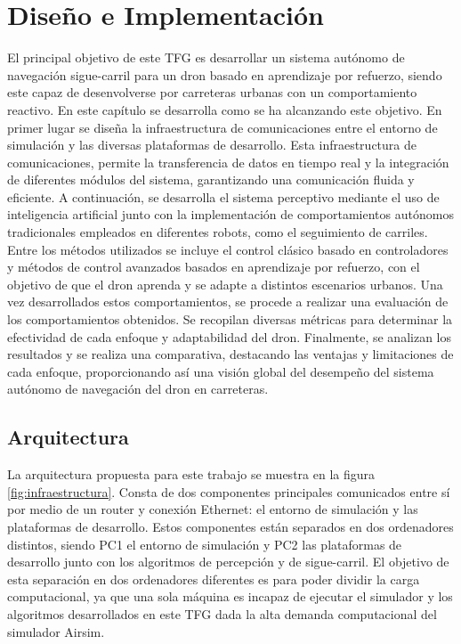 \chapter{Diseño e Implementación}
\label{cap:capitulo4}


\vspace{1cm}
El principal objetivo de este TFG es desarrollar un sistema autónomo de navegación sigue-carril para un dron basado en aprendizaje por refuerzo, siendo este capaz de desenvolverse
por carreteras urbanas con un comportamiento reactivo.
En este capítulo se desarrolla como se ha alcanzando este objetivo. En primer lugar se diseña la infraestructura de comunicaciones entre el entorno de simulación y las diversas 
plataformas de desarrollo. Esta 
infraestructura de comunicaciones, permite la transferencia de datos en tiempo real y la integración de diferentes módulos del sistema, garantizando 
una comunicación fluida y eficiente.
A continuación, se desarrolla el sistema perceptivo mediante el uso de inteligencia artificial junto con la implementación de comportamientos autónomos tradicionales empleados
 en diferentes robots, como el seguimiento de carriles. Entre los métodos utilizados se incluye 
el control clásico basado en controladores y métodos de control avanzados basados en aprendizaje por refuerzo, con el objetivo de que el dron aprenda y se 
adapte a distintos escenarios urbanos. 
Una vez desarrollados estos comportamientos, se procede a realizar una evaluación de los comportamientos obtenidos. Se recopilan
diversas métricas para determinar la efectividad de cada enfoque y adaptabilidad del dron. 
Finalmente, se analizan los resultados y se realiza una comparativa, destacando las ventajas y limitaciones de cada enfoque, 
proporcionando así una visión global del desempeño del sistema autónomo 
de navegación del dron en carreteras.

\section{Arquitectura}
\label{sec:Arquitectura}

La arquitectura propuesta para este trabajo se muestra en la figura \ref{fig:infraestructura}. Consta de dos componentes principales 
comunicados entre sí por medio de un router y conexión Ethernet: el entorno de simulación  y las plataformas de desarrollo. Estos componentes 
están separados en dos ordenadores distintos, siendo PC1 el entorno de simulación y PC2 las plataformas de desarrollo junto con los algoritmos de percepción y de sigue-carril. 
El objetivo de esta separación en dos ordenadores diferentes es para poder dividir la carga computacional, ya que una sola máquina es incapaz de ejecutar el simulador y los algoritmos 
desarrollados en este TFG dada la alta demanda computacional del simulador Airsim. 

